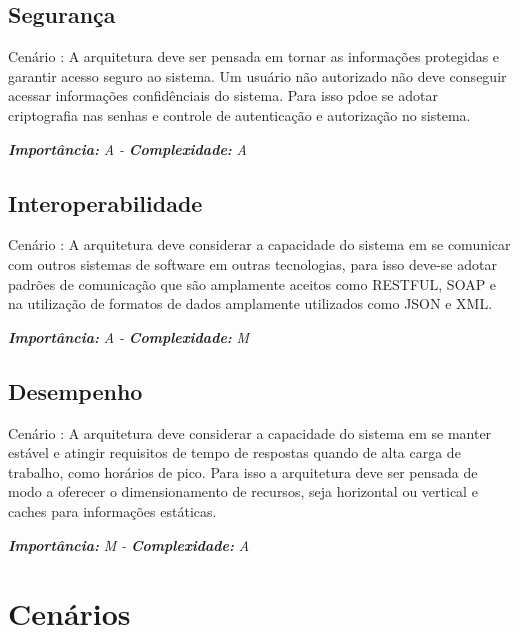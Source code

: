 \pgfmathtruncatemacro{}
\subsection{Segurança}
Cenário \nava: A arquitetura deve ser pensada em tornar as informações protegidas e garantir acesso seguro ao sistema.
Um usuário não autorizado não deve conseguir acessar informações confidênciais do sistema. Para isso pdoe se adotar 
criptografia nas senhas e controle de autenticação e autorização no sistema.

\vspace{0.5cm}
\noindent\textbf{\textit{Importância:}} \textit{A -} \textbf{\textit{Complexidade:}} \textit{A}
\vspace{0.5cm}

\pgfmathtruncatemacro{}
\subsection{Interoperabilidade}
Cenário \nava: A arquitetura deve considerar a capacidade do sistema em se comunicar com outros sistemas de software
em outras tecnologias, para isso deve-se adotar padrões de comunicação que são amplamente aceitos como RESTFUL, SOAP
e na utilização de formatos de dados amplamente utilizados como JSON e XML.

\vspace{0.5cm}
\noindent\textbf{\textit{Importância:}} \textit{A -} \textbf{\textit{Complexidade:}} \textit{M}
\vspace{0.5cm}

\pgfmathtruncatemacro{}
\subsection{Desempenho}
Cenário \nava: A arquitetura deve considerar a capacidade do sistema em se manter estável e atingir requisitos de 
tempo de respostas quando de alta carga de trabalho, como horários de pico. Para isso a arquitetura deve ser pensada de modo 
a oferecer o dimensionamento de recursos, seja horizontal ou vertical e caches para informações estáticas.

\vspace{0.5cm}
\noindent\textbf{\textit{Importância:}} \textit{M -} \textbf{\textit{Complexidade:}} \textit{A}
\vspace{0.5cm}

\pgfmathsetmacro{}
\section{Cenários}
\vspace{0.5cm}

